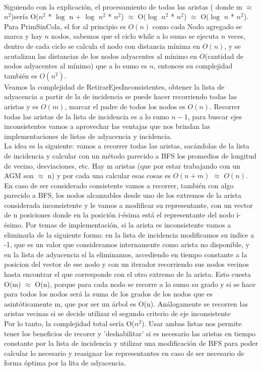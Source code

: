 \documentclass[11pt,a4paper]{article}
\begin{document}
\\Siguiendo con la explicación, el procesamiento de todas las aristas ( donde m $\approx$ $n^{2}$)sería O($n^2$ * $\log$ n + $\log$ $n^{2}$ * $n^{2}$) $\approx$ O($\log$ $n^{2}$ * $n^{2}$) $\approx$ O($\log$ $n$ * $n^{2}$).
\\
Para PrimSinCola, el for al principio es $O(n)$ como cada Nodo agregado se marca y hay $n$ nodos, sabemos que el ciclo while a lo sumo se ejecuta $n$ veces, dentro de cada ciclo se calcula el nodo con distancia mínima en $O(n)$, y se acutalizan las distancias de los nodos adyacentes al mínimo en $O$(cantidad de nodos adyacentes al mínimo) que a lo sumo es $n$, entonces su complejidad también es $O(n^2)$.
\\
Veamos la complejidad de RetirarEjesInconsistentes, obtener la lista de adyacencia a partir de la de incidencia se puede hacer recorriendo todas las aristas y es $O(m)$, marcar el padre de todos los nodos es $O(n)$.
Recorrer todas las aristas de la lista de incidencia es a lo sumo $n - 1$, para buscar ejes inconsistentes vamos a aprovechar las ventajas que nos brindan las implementaciones de listas de adyacencia y incidencia. \\
La idea es la siguiente: vamos a recorrer todas las aristas, sacándolas de la lista de incidencia y calcular con un método parecido a BFS los promedios de longitud de vecino, desviaciones, etc. Hay m aristas (que por estar trabajando con un AGM son $\approx$ n) y por cada una calcular esas cosas es $O(n+m)$ $\approx$ $O(n)$. En caso de ser considerado consistente vamos a recorrer, también con algo parecido a BFS, los nodos alcanzables desde uno de los extremos de la arista considerada inconsistente y le vamos a modificar su representante, con un vector de n posiciones donde en la posición i-ésima está el representante del nodo i-ésimo. Por temas de implementación, si la arista es inconsistente vamos a eliminarla de la siguiente forma: en la lista de incidencia modificamos su indice a -1, que es un valor que consideramos internamente como arista no disponible, y en la lista de adyacencia sí la eliminamos, accediendo en tiempo constante a la posicion del vector de ese nodo y con un iterador recorriendo sus nodos vecinos hasta encontrar el que corresponde con el otro extremo de la arista. Esto cuesta O(m) $\approx$ O(n), porque para cada nodo se recorre a lo sumo su grado y si se hace para todos los nodos será la suma de los grados de los nodos que es asintóticamente m, que por ser un árbol es O(n).
Análogamente se recorren las aristas vecinas si se decide utilizar el segundo criterio de eje inconsistente\\
Por lo tanto, la complejidad total sería O($n^{2}$). Usar ambas listas nos permite tener los beneficios de recorer y 'deshabilitar' si es necesario las aristas en tiempo constante por la lista de incidencia y utilizar una modificación de BFS para poder calcular lo necesario y reasignar los representantes en caso de ser necesario de forma óptima por la lita de adyacencia.
\end{document}
